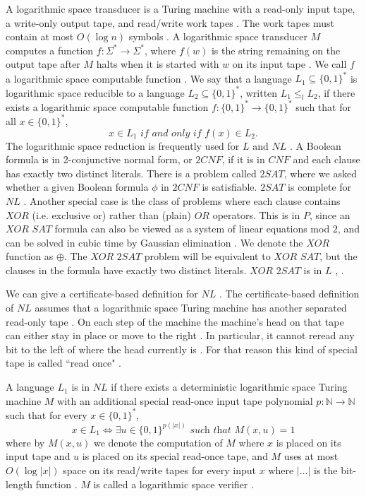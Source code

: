 \documentclass[a4paper,UKenglish,cleveref, autoref]{lipics-v2019}
\begin{document}
A logarithmic space transducer is a Turing machine with a read-only input tape, a write-only output tape, and read/write work tapes \cite{MS06}. The work tapes must contain at most $O(\log n)$ symbols \cite{MS06}. A logarithmic space transducer $M$ computes a function $f : \Sigma^{*} \rightarrow \Sigma^{*}$, where $f(w)$ is the string remaining on the output tape after $M$ halts when it is started with $w$ on its input tape \cite{MS06}. We call $f$ a logarithmic space computable function \cite{MS06}. We say that a language $L_{1} \subseteq \{0, 1\}^{*}$ is logarithmic space reducible to a language $L_{2} \subseteq \{0, 1\}^{*}$, written $L_{1} \leq_{l} L_{2}$, if there exists a logarithmic space computable function $f : \{0, 1\}^{*} \rightarrow \{0, 1\}^{*}$ such that for all $x \in \{0, 1\}^{*}$,
\[x \in L_{1} \textit{ if and only if } f(x) \in L_{2}.\]
The logarithmic space reduction is frequently used for $L$ and $NL$ \cite{Pap03}. A Boolean formula is in 2-conjunctive normal form, or $2CNF$, if it is in $CNF$ and each clause has exactly two distinct literals. There is a problem called $2SAT$, where we asked whether a given Boolean formula $\phi$ in $2CNF$ is satisfiable. $2SAT$ is complete for $NL$ \cite{Pap03}. Another special case is the class of problems where each clause contains $XOR$ (i.e. exclusive or) rather than (plain) $OR$ operators. This is in $P$, since an $\textit{XOR SAT}$ formula can also be viewed as a system of linear equations mod $2$, and can be solved in cubic time by Gaussian elimination \cite{MM11}. We denote the $XOR$ function as $\oplus$. The $\textit{XOR 2SAT}$ problem will be equivalent to $\textit{XOR SAT}$, but the clauses in the formula have exactly two distinct literals. $\textit{XOR 2SAT}$ is in $L$ \cite{AR00}, \cite{RM08}.

We can give a certificate-based definition for $NL$ \cite{AB09}. The certificate-based definition of $NL$ assumes that a logarithmic space Turing machine has another separated read-only tape \cite{AB09}. On each step of the machine the machine's head on that tape can either stay in place or move to the right \cite{AB09}. In particular, it cannot reread any bit to the left of where the head currently is \cite{AB09}. For that reason this kind of special tape is called ``read once" \cite{AB09}.

\begin{definition}
A language $L_{1}$ is in $NL$ if there exists a deterministic logarithmic space Turing machine $M$ with an additional special read-once input tape polynomial $p: \mathbb{N} \rightarrow \mathbb{N}$ such that for every $x \in \{0, 1\}^{*}$,
\[x \in L_{1} \Leftrightarrow \exists u \in \{0, 1\}^{p(|x|)} \textit{ such that } M(x, u) = 1 \]
where by $M(x, u)$ we denote the computation of $M$ where $x$ is placed on its input tape and $u$ is placed on its special read-once tape, and $M$ uses at most $O(\log |x|)$ space on its read/write tapes for every input $x$ where $|\ldots|$ is the bit-length function \cite{AB09}. $M$ is called a logarithmic space verifier \cite{AB09}.
\end{definition}
\end{document}
